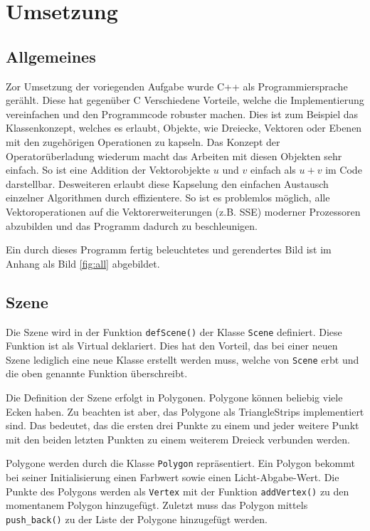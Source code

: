 \documentclass[final,a4paper,11pt,notitlepage,halfparskip]{scrreprt}
\begin{document}
\chapter{Umsetzung}
\section{Allgemeines}
Zor Umsetzung der voriegenden Aufgabe wurde C++ als Programmiersprache gerählt.
Diese hat gegenüber C Verschiedene Vorteile, welche die Implementierung
vereinfachen und den Programmcode robuster machen. Dies ist zum Beispiel das
Klassenkonzept, welches es erlaubt, Objekte, wie Dreiecke, Vektoren oder Ebenen
mit den zugehörigen Operationen zu kapseln. Das Konzept der Operatorüberladung
wiederum macht das Arbeiten mit diesen Objekten sehr einfach. So ist eine
Addition der Vektorobjekte $u$ und $v$ einfach als $u + v$ im Code darstellbar.
Desweiteren erlaubt diese Kapselung den einfachen Austausch einzelner
Algorithmen durch effizientere. So ist es problemlos möglich, alle
Vektoroperationen auf die Vektorerweiterungen (z.B. SSE) moderner Prozessoren 
abzubilden und das Programm dadurch zu beschleunigen.

Ein durch dieses Programm fertig beleuchtetes und gerendertes Bild ist im Anhang
als Bild \ref{fig:all} abgebildet.

\section{Szene}
Die Szene wird in der Funktion \texttt{defScene()} der Klasse \texttt{Scene}
definiert. Diese Funktion ist als Virtual deklariert. Dies hat den Vorteil, das
bei einer neuen Szene lediglich eine neue Klasse erstellt werden muss, welche
von \texttt{Scene} erbt und die oben genannte Funktion überschreibt.

Die Definition der Szene erfolgt in Polygonen. Polygone können beliebig viele
Ecken haben. Zu beachten ist aber, das Polygone als TriangleStrips implementiert
sind. Das bedeutet, das die ersten drei Punkte zu einem und jeder weitere Punkt 
mit den beiden letzten Punkten zu einem weiterem Dreieck verbunden werden.

Polygone werden durch die Klasse \texttt{Polygon} repräsentiert. Ein Polygon
bekommt bei seiner Initialisierung einen Farbwert sowie einen Licht-Abgabe-Wert.
Die Punkte des Polygons werden als \texttt{Vertex} mit der Funktion
\texttt{addVertex()} zu den momentanem Polygon hinzugefügt. Zuletzt muss das
Polygon mittels \texttt{push\_back()} zu der Liste der Polygone hinzugefügt
werden.
\end{document}
